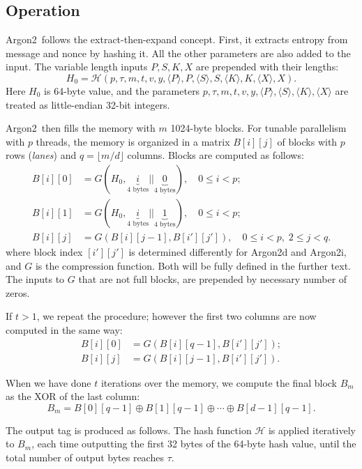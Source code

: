\documentclass[a4paper]{article}
\begin{document}
\subsection{Operation}

\textsf{Argon2}\ follows the extract-then-expand concept. First, it extracts entropy from message and nonce by hashing it.  All the other parameters are also added to the input. The variable length inputs $P,S,K,X$  are prepended with their lengths:
$$
H_0 = \mathcal{H}(p,\tau,m,t,v,y,\langle P \rangle,P,\langle S \rangle,S,\langle K \rangle,K, \langle X \rangle,X).
$$
Here $H_0$ is 64-byte value, and the parameters $p,\tau,m,t,v,y,
\langle P \rangle,\langle S \rangle, \langle K \rangle,\langle X \rangle$ are treated as little-endian 32-bit integers.

\textsf{Argon2}\ then fills the memory with $m$ 1024-byte blocks. For tunable parallelism with $p$ threads, the memory is organized in a matrix $B[i][j]$ of blocks
with $p$ rows (\emph{lanes}) and $q=\lfloor m/d \rfloor$ columns. Blocks are computed as follows:
\begin{align*}
B[i][0] &= G(H_0,\underbrace{i}_{\text{4 bytes}}||\underbrace{0}_{\text{4 bytes}}),\quad 0 \leq i < p; \\
B[i][1] &= G(H_0,\underbrace{i}_{\text{4 bytes}}||\underbrace{1}_{\text{4 bytes}}),\quad 0 \leq i < p;\\
B[i][j] &= G(B[i][j-1], B[i'][j']),\quad 0 \leq i < p,\; 2\leq j <q.
\end{align*}
where block index $[i'][j']$ is determined differently for \textsf{Argon2d} and \textsf{Argon2i}, and $G$ is the compression function. Both will be fully defined in the further text. The inputs to $G$ that are not full blocks, are prepended by necessary number of zeros.

If $t>1$, we repeat the procedure; however the first two columns are now computed in the same way:
\begin{align*}
B[i][0] &=G(B[i][q-1], B[i'][j']);\\
B[i][j] &= G(B[i][j-1], B[i'][j']).
\end{align*}

When we have done  $t$ iterations over the memory, we compute the final block $B_m$ as the XOR of the last column:
$$
B_m = B[0][q-1] \oplus B[1][q-1]\oplus \cdots\oplus B[d-1][q-1].
$$

The output tag is produced as follows. The hash function $\mathcal{H}$ is applied iteratively to $B_m$, each time outputting the first 32 bytes of the 64-byte hash value, until the total number
of output bytes reaches $\tau$.
\end{document}
